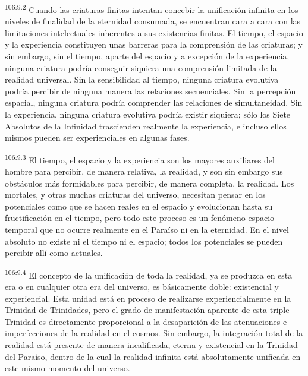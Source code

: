 \documentclass[twoside, 11pt]{book}
\begin{document}
\par
\textsuperscript{106:9.2} Cuando las criaturas finitas intentan concebir la unificación infinita en los niveles de finalidad de la eternidad consumada, se encuentran cara a cara con las limitaciones intelectuales inherentes a sus existencias finitas. El tiempo, el espacio y la experiencia constituyen unas barreras para la comprensión de las criaturas; y sin embargo, sin el tiempo, aparte del espacio y a excepción de la experiencia, ninguna criatura podría conseguir siquiera una comprensión limitada de la realidad universal. Sin la sensibilidad al tiempo, ninguna criatura evolutiva podría percibir de ninguna manera las relaciones secuenciales. Sin la percepción espacial, ninguna criatura podría comprender las relaciones de simultaneidad. Sin la experiencia, ninguna criatura evolutiva podría existir siquiera; sólo los Siete Absolutos de la Infinidad trascienden realmente la experiencia, e incluso ellos mismos pueden ser experienciales en algunas fases.

\par
\textsuperscript{106:9.3} El tiempo, el espacio y la experiencia son los mayores auxiliares del hombre para percibir, de manera relativa, la realidad, y son sin embargo sus obstáculos más formidables para percibir, de manera completa, la realidad. Los mortales, y otras muchas criaturas del universo, necesitan pensar en los potenciales como que se hacen reales en el espacio y evolucionan hasta su fructificación en el tiempo, pero todo este proceso es un fenómeno espacio-temporal que no ocurre realmente en el Paraíso ni en la eternidad. En el nivel absoluto no existe ni el tiempo ni el espacio; todos los potenciales se pueden percibir allí como actuales.

\par
\textsuperscript{106:9.4} El concepto de la unificación de toda la realidad, ya se produzca en esta era o en cualquier otra era del universo, es básicamente doble: existencial y experiencial. Esta unidad está en proceso de realizarse experiencialmente en la Trinidad de Trinidades, pero el grado de manifestación aparente de esta triple Trinidad es directamente proporcional a la desaparición de las atenuaciones e imperfecciones de la realidad en el cosmos. Sin embargo, la integración total de la realidad está presente de manera incalificada, eterna y existencial en la Trinidad del Paraíso, dentro de la cual la realidad infinita está absolutamente unificada en este mismo momento del universo.
\end{document}

